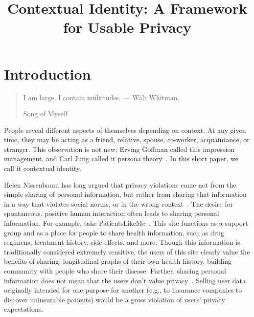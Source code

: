 \documentclass{llncs}
\begin{document}
\title{Contextual Identity: A Framework for Usable Privacy}

\maketitle
\section{Introduction}
\begin{quote}I am large, I contain multitudes. --- Walt Whitman,
\begin{em}Song of Myself\end{em} \end{quote}

People reveal different aspects of themselves depending on context. At any
given time, they may be acting as a friend, relative, spouse, co-worker,
acquaintance, or stranger. This observation is not new; Erving Goffman called
this impression management, and Carl Jung called it persona
theory~\cite{goffman,jung}. In this short paper, we call it contextual identity.

Helen Nissenbaum has long argued that privacy violations come not from the
simple sharing of personal information, but rather from sharing that
information in a way that violates social norms, or in the wrong
context~\cite{nissenbaum}. The desire for spontaneous, positive human
interaction often leads to sharing personal information. For example, take
PatientsLikeMe~\cite{patientslikeme}. This site functions as a support group
and as a place for people to share health information, such as drug regimens,
treatment history, side-effects, and more. Though this information is
traditionally considered extremely sensitive, the users of this site clearly
value the benefits of sharing: longitudinal graphs of their own health history,
building community with people who share their disease. Further, sharing
personal information does not mean that the users don't value
privacy~\cite{boyd2}. Selling user data originally intended for one purpose for
another (e.g., to insurance companies to discover uninsurable patients) would
be a gross violation of users' privacy expectations.

\end{document}
